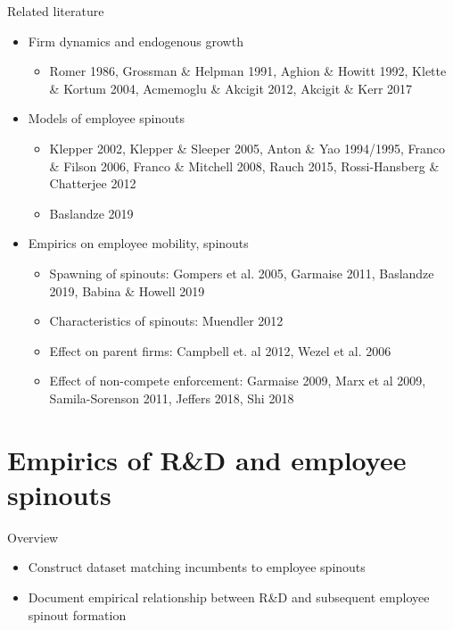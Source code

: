 \documentclass[english,usenames,dvipsnames]{beamer}
\begin{document}
\begin{frame}{Related literature}
\begin{itemize}
\item Firm dynamics and endogenous growth
\begin{itemize}
\item Romer 1986, Grossman \& Helpman 1991, Aghion \& Howitt 1992, Klette \& Kortum 2004, Acmemoglu \& Akcigit 2012, Akcigit \& Kerr 2017
\end{itemize}
\smallskip
\item Models of employee spinouts
\begin{itemize}
\item Klepper 2002, Klepper \& Sleeper 2005, Anton \& Yao 1994/1995, Franco \& Filson 2006, Franco \& Mitchell 2008, Rauch 2015, Rossi-Hansberg \& Chatterjee 2012
\item Baslandze 2019
\end{itemize}
\smallskip
\item Empirics on employee mobility, spinouts
\begin{itemize}
\item Spawning of spinouts: Gompers et al. 2005, Garmaise 2011, Baslandze 2019, Babina \& Howell 2019
\item Characteristics of spinouts: Muendler 2012
\item Effect on parent firms: Campbell et. al 2012, Wezel et al. 2006
\item Effect of non-compete enforcement: Garmaise 2009, Marx et al 2009, Samila-Sorenson 2011, Jeffers 2018, Shi 2018
\end{itemize}
\end{itemize}
\end{frame}

\section{Empirics of R\&D and employee spinouts}

\begin{frame}
	\tableofcontents[currentsection]
\end{frame}

\begin{frame}{Overview}
	\begin{itemize}
		\item Construct dataset matching incumbents to employee spinouts
		\smallskip
		\item Document empirical relationship between R\&D and subsequent employee spinout formation
	\end{itemize}
\end{frame}
\end{document}
